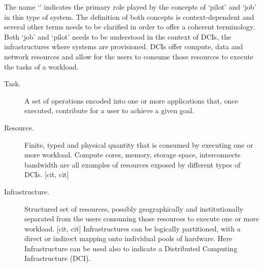 \documentclass{sig-alternate}
\begin{document}

The name `\pilotjob' indicates the primary role played by the concepts of `pilot' and `job' in this type of system. The definition of both concepts is context-dependent and several other terms needs to be clarified in order to offer a coherent terminology. Both `job' and `pilot' needs to be understood in the context of DCIs, the infrastructures where \pilotjobs systems are provisioned. DCIs offer compute, data and network resources and \pilotjobs allow for the users to consume those resources to execute the tasks of a workload.

\begin{description}
  \item[Task.] A set of operations encoded into one or more applications that, once executed, contribute for a user to achieve a given goal.
  \item[Resource.] Finite, typed and physical quantity that is consumed by executing one or more workload. Compute cores, memory, storage space,  interconnects bandwidth are all examples of resources exposed by different types of DCIs. [cit, cit]
  \item[Infrastructure.] Structured set of resources, possibly geographically and institutionally separated from the users consuming those resources to execute one or more workload. [cit, cit] Infrastructures can be logically partitioned, with a direct or indirect mapping onto individual pools of hardware. Here Infrastructure can be used also to indicate a Distributed Computing Infrastructure (DCI).
\end{description}
\end{document}
